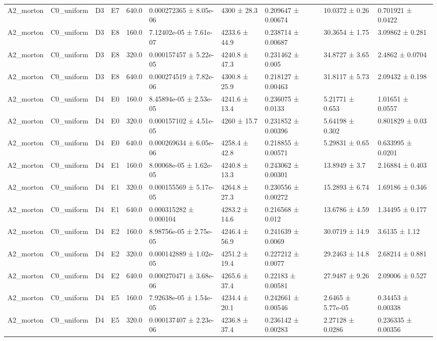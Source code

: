 \begin{table}
\begin{tabular}{llllllllll}
A2\_morton & C0\_uniform & D3 & E7 & 640.0 & 0.000272365 ± 8.05e-06 & 4300 ± 28.3 & 0.209647 ± 0.00674 & 10.0372 ± 0.26 & 0.701921 ± 0.0422 \\
A2\_morton & C0\_uniform & D3 & E8 & 160.0 & 7.12402e-05 ± 7.61e-07 & 4233.6 ± 44.9 & 0.238714 ± 0.00687 & 30.3654 ± 1.75 & 3.09862 ± 0.281 \\
A2\_morton & C0\_uniform & D3 & E8 & 320.0 & 0.000157457 ± 5.22e-05 & 4240.8 ± 47.3 & 0.231462 ± 0.005 & 34.8727 ± 3.65 & 2.4862 ± 0.0704 \\
A2\_morton & C0\_uniform & D3 & E8 & 640.0 & 0.000274519 ± 7.82e-06 & 4300.8 ± 25.9 & 0.218127 ± 0.00463 & 31.8117 ± 5.73 & 2.09432 ± 0.198 \\
A2\_morton & C0\_uniform & D4 & E0 & 160.0 & 8.45894e-05 ± 2.53e-05 & 4241.6 ± 13.4 & 0.236075 ± 0.0133 & 5.21771 ± 0.653 & 1.01651 ± 0.0557 \\
A2\_morton & C0\_uniform & D4 & E0 & 320.0 & 0.000157102 ± 4.51e-05 & 4260 ± 15.7 & 0.231852 ± 0.00396 & 5.64198 ± 0.302 & 0.801829 ± 0.03 \\
A2\_morton & C0\_uniform & D4 & E0 & 640.0 & 0.000269634 ± 6.05e-06 & 4258.4 ± 42.8 & 0.218855 ± 0.00571 & 5.29831 ± 0.65 & 0.633995 ± 0.0201 \\
A2\_morton & C0\_uniform & D4 & E1 & 160.0 & 8.00068e-05 ± 1.62e-05 & 4240.8 ± 13.3 & 0.243062 ± 0.00301 & 13.8949 ± 3.7 & 2.16884 ± 0.403 \\
A2\_morton & C0\_uniform & D4 & E1 & 320.0 & 0.000155569 ± 5.17e-05 & 4264.8 ± 27.3 & 0.230556 ± 0.00272 & 15.2893 ± 6.74 & 1.69186 ± 0.346 \\
A2\_morton & C0\_uniform & D4 & E1 & 640.0 & 0.000315282 ± 0.000104 & 4283.2 ± 14.6 & 0.216568 ± 0.012 & 13.6786 ± 4.59 & 1.34495 ± 0.177 \\
A2\_morton & C0\_uniform & D4 & E2 & 160.0 & 8.98756e-05 ± 2.75e-05 & 4246.4 ± 56.9 & 0.241639 ± 0.0069 & 30.0719 ± 14.9 & 3.6135 ± 1.12 \\
A2\_morton & C0\_uniform & D4 & E2 & 320.0 & 0.000142889 ± 1.02e-05 & 4251.2 ± 19.4 & 0.227212 ± 0.0077 & 29.2463 ± 14.8 & 2.68214 ± 0.881 \\
A2\_morton & C0\_uniform & D4 & E2 & 640.0 & 0.000270471 ± 3.68e-06 & 4265.6 ± 37.4 & 0.22183 ± 0.00581 & 27.9487 ± 9.26 & 2.09006 ± 0.527 \\
A2\_morton & C0\_uniform & D4 & E5 & 160.0 & 7.92638e-05 ± 1.54e-05 & 4234.4 ± 20.1 & 0.242661 ± 0.00546 & 2.6465 ± 5.77e-05 & 0.34453 ± 0.00338 \\
A2\_morton & C0\_uniform & D4 & E5 & 320.0 & 0.000137407 ± 2.23e-06 & 4236.8 ± 37.4 & 0.236142 ± 0.00283 & 2.27128 ± 0.0286 & 0.236335 ± 0.00356 \\

\end{tabular}
\end{table}
